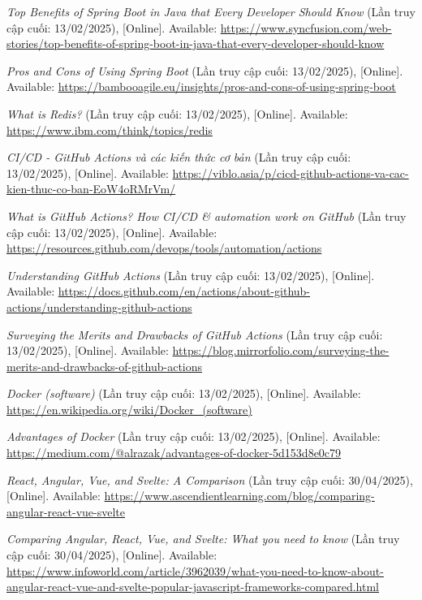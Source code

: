 \documentclass[12pt, a4paper]{article}
\begin{document}
\begin{thebibliography}{}
	 \textit{Top Benefits of Spring Boot in Java that Every Developer Should Know} (Lần truy cập cuối: 13/02/2025), [Online]. Available: \url{https://www.syncfusion.com/web-stories/top-benefits-of-spring-boot-in-java-that-every-developer-should-know}

	 \textit{Pros and Cons of Using Spring Boot} (Lần truy cập cuối: 13/02/2025), [Online]. Available: \url{https://bambooagile.eu/insights/pros-and-cons-of-using-spring-boot}

	 \textit{What is Redis?} (Lần truy cập cuối: 13/02/2025), [Online]. Available: \url{https://www.ibm.com/think/topics/redis}


	 \textit{CI/CD - GitHub Actions và các kiến thức cơ bản} (Lần truy cập cuối: 13/02/2025), [Online]. Available: \url{https://viblo.asia/p/cicd-github-actions-va-cac-kien-thuc-co-ban-EoW4oRMrVm/}


	 \textit{What is GitHub Actions? How CI/CD \& automation work on GitHub} (Lần truy cập cuối: 13/02/2025), [Online]. Available: \url{https://resources.github.com/devops/tools/automation/actions}

	 \textit{Understanding GitHub Actions} (Lần truy cập cuối: 13/02/2025), [Online]. Available: \url{https://docs.github.com/en/actions/about-github-actions/understanding-github-actions}

	 \textit{Surveying the Merits and Drawbacks of GitHub Actions} (Lần truy cập cuối: 13/02/2025), [Online]. Available: \url{https://blog.mirrorfolio.com/surveying-the-merits-and-drawbacks-of-github-actions}

	 \textit{Docker (software)} (Lần truy cập cuối: 13/02/2025), [Online]. Available: \url{https://en.wikipedia.org/wiki/Docker\_(software)}

	 \textit{Advantages of Docker} (Lần truy cập cuối: 13/02/2025), [Online]. Available: \url{https://medium.com/@alrazak/advantages-of-docker-5d153d8e0c79}

	 \textit{React, Angular, Vue, and Svelte: A Comparison} (Lần truy cập cuối: 30/04/2025), [Online]. Available: \url{https://www.ascendientlearning.com/blog/comparing-angular-react-vue-svelte}

	 \textit{Comparing Angular, React, Vue, and Svelte: What you need to know} (Lần truy cập cuối: 30/04/2025), [Online]. Available: \url{https://www.infoworld.com/article/3962039/what-you-need-to-know-about-angular-react-vue-and-svelte-popular-javascript-frameworks-compared.html}


\end{thebibliography}
\end{document}
